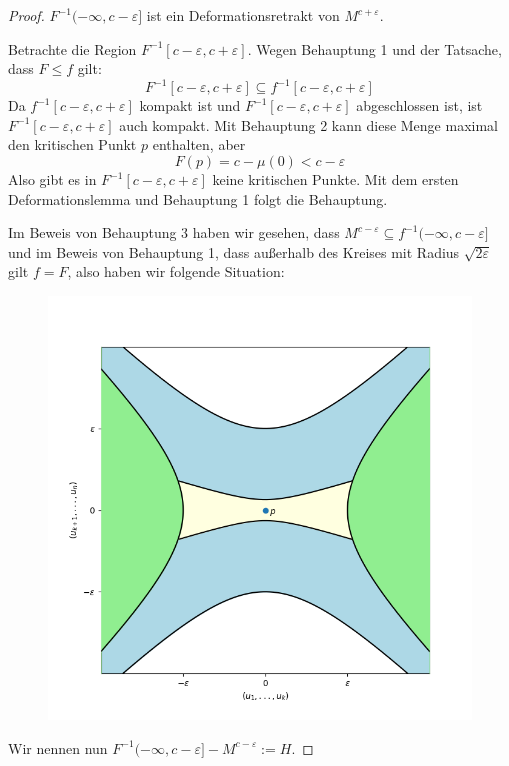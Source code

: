 \documentclass[a4paper,11pt]{article}
\begin{document}
\begin{proof}
     $F^{-1}(-\infty, c - \varepsilon]$ ist ein
    Deformationsretrakt von $M^{c + \varepsilon}$.

    Betrachte die Region $F^{-1}[c - \varepsilon, c + \varepsilon]$. Wegen 
    Behauptung 1 und der Tatsache, dass $F \leq f$ gilt:
    \[ F^{-1}[c - \varepsilon, c + \varepsilon] \subseteq f^{-1}[c - \varepsilon, c + \varepsilon] \]
    Da $f^{-1}[c - \varepsilon, c + \varepsilon]$ kompakt ist und 
    $F^{-1}[c - \varepsilon, c + \varepsilon]$ abgeschlossen ist, ist 
    $F^{-1}[c - \varepsilon, c + \varepsilon]$ auch kompakt. Mit Behauptung 2
    kann diese Menge maximal den kritischen Punkt $p$ enthalten, aber
    \[ F(p) = c - \mu(0) < c - \varepsilon \]
    Also gibt es in $F^{-1}[c - \varepsilon, c + \varepsilon]$ keine kritischen
    Punkte. Mit dem ersten Deformationslemma und Behauptung 1 folgt die 
    Behauptung.
    \sectiondone

    Im Beweis von Behauptung 3 haben wir gesehen, dass 
    $M^{c - \varepsilon} \subseteq f^{-1}(-\infty, c - \varepsilon]$ und im
    Beweis von Behauptung 1, dass außerhalb des Kreises mit Radius 
    $\sqrt{2 \varepsilon}$ gilt $f = F$, also haben wir folgende Situation:
    
    \begin{figure}[H]
        \centering
        \includegraphics[width=0.8\linewidth]{resources/Me-Diagram7-handle.png}
        \label{fig:me-diagram7}
    \end{figure}

    Wir nennen nun $F^{-1}(-\infty, c-\varepsilon] - M^{c - \varepsilon} := H$.


\end{proof}
\end{document}
